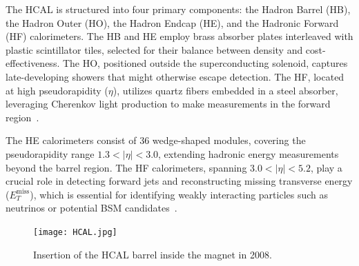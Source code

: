 The HCAL is structured into four primary components: the Hadron Barrel (HB), the Hadron Outer (HO), the Hadron Endcap (HE), and the Hadronic Forward (HF) calorimeters. The HB and HE employ brass absorber plates interleaved with plastic scintillator tiles, selected for their balance between density and cost-effectiveness. The HO, positioned outside the superconducting solenoid, captures late-developing showers that might otherwise escape detection. The HF, located at high pseudorapidity (\(\eta\)), utilizes quartz fibers embedded in a steel absorber, leveraging Cherenkov light production to make measurements in the forward region~\cite{CMS-HCAL-Performance}.

The HE calorimeters consist of 36 wedge-shaped modules, covering the pseudorapidity range \(1.3 < |\eta| < 3.0\), extending hadronic energy measurements beyond the barrel region. The HF calorimeters, spanning \(3.0 < |\eta| < 5.2\), play a crucial role in detecting forward jets and reconstructing missing transverse energy (\(E_T^{\text{miss}}\)), which is essential for identifying weakly interacting particles such as neutrinos or potential BSM candidates~\cite{CMS-Trigger-Performance}.


\begin{figure}[!htb]
    \begin{center}
        \texttt{[image: HCAL.jpg]}
        \caption{Insertion of the HCAL barrel inside the magnet in 2008.}
        \label{fig:HCAL}
    \end{center}
\end{figure}




